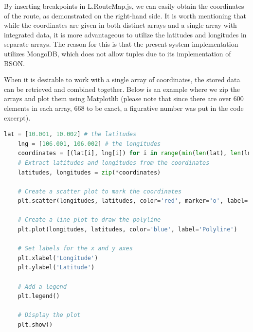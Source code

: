 By inserting breakpoints in L.RouteMap.js, we can easily obtain the coordinates of the route, as demonstrated on the right-hand side. It is worth mentioning that while the coordinates are given in both distinct arrays and a single array with integrated data, it is more advantageous to utilize the latitudes and longitudes in separate arrays. The reason for this is that the present system implementation utilizes MongoDB, which does not allow tuples due to its implementation of BSON.

When it is desirable to work with a single array of coordinates, the stored data can be retrieved and combined together. Below is an example where we zip the arrays and plot them using Matplotlib (please note that since there are over 600 elements in each array, 668 to be exact, a figurative number was put in the code excerpt).

\newpage

\begin{lstlisting}[language=python]
    lat = [10.001, 10.002] # the latitudes
    lng = [106.001, 106.002] # the longitudes
    coordinates = [(lat[i], lng[i]) for i in range(min(len(lat), len(lng)))]
    # Extract latitudes and longitudes from the coordinates
    latitudes, longitudes = zip(*coordinates)
    
    # Create a scatter plot to mark the coordinates
    plt.scatter(longitudes, latitudes, color='red', marker='o', label='Coordinates')
    
    # Create a line plot to draw the polyline
    plt.plot(longitudes, latitudes, color='blue', label='Polyline')
    
    # Set labels for the x and y axes
    plt.xlabel('Longitude')
    plt.ylabel('Latitude')
    
    # Add a legend
    plt.legend()
    
    # Display the plot
    plt.show()
\end{lstlisting}

